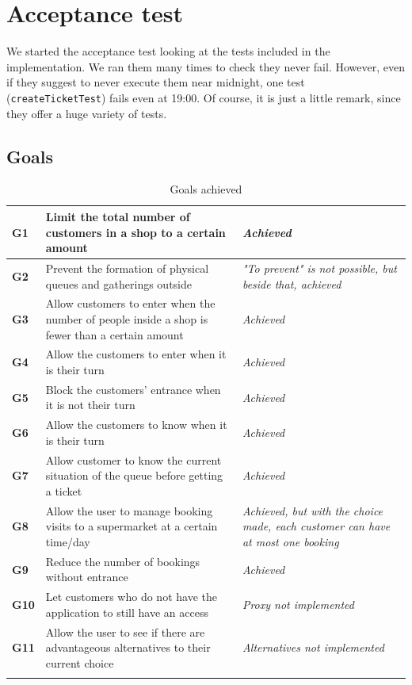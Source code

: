 \documentclass[a4paper,oneside,11pt]{book}
\begin{document}
\chapter{Acceptance test}
    We started the acceptance test looking at the tests included in the implementation. We ran them many times to check they never fail. However, even if they suggest to never execute them near midnight, one test (\texttt{createTicketTest}) fails even at 19:00. Of course, it is just a little remark, since they offer a huge variety of tests.
    \section{Goals}
    \begin{longtable}[c] { |>{\centering\arraybackslash}C{0.08\textwidth}|>{\arraybackslash}H{0.47\textwidth}|>{\centering\arraybackslash}H{0.23\textwidth}| }
        \hline
        \textbf{G1} & Limit the total number of customers in a shop to a certain amount & \textit{Achieved} \\ \hline
        \textbf{G2} & Prevent the formation of physical queues and gatherings outside & \textit{"To prevent" is not possible, but beside that, achieved} \\ \hline
        \textbf{G3} & Allow customers to enter when the number of people inside a shop is fewer than a certain amount & \textit{Achieved} \\ \hline
        \textbf{G4} & Allow the customers to enter when it is their turn & \textit{Achieved} \\ \hline
        \textbf{G5} & Block the customers’ entrance when it is not their turn & \textit{Achieved} \\ \hline
        \textbf{G6} & Allow the customers to know when it is their turn & \textit{Achieved} \\ \hline
        \textbf{G7} & Allow customer to know the current situation of the queue before getting a ticket & \textit{Achieved} \\ \hline
        \textbf{G8} & Allow the user to manage booking visits to a supermarket at a certain time/day & \textit{Achieved, but with the choice made, each customer can have at most one booking} \\ \hline
        \textbf{G9} & Reduce the number of bookings without entrance & \textit{Achieved} \\ \hline
        \textbf{G10} & Let customers who do not have the application to still have an access & \textit{Proxy not implemented} \\ \hline
        \textbf{G11} & Allow the user to see if there are advantageous alternatives to their current choice & \textit{Alternatives not implemented} \\ \hline
        \caption{Goals achieved}
        \label{table:goals}
    \end{longtable} 
    
\end{document}
